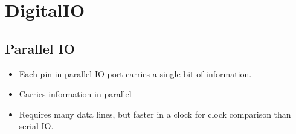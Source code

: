 \section{DigitalIO}
	\subsection{Parallel IO}
		\begin{itemize}
			\item Each pin in parallel IO port carries a single bit of information.
			\item Carries information in parallel
			\item Requires many data lines, but faster in a clock for clock comparison than serial IO.
		\end{itemize}
